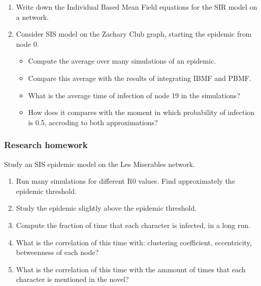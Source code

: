 \newpage

\begin{enumerate}
 \item Write down the Individual Based Mean Field equations for the SIR model on a network.
 \item Consider SIS model on the Zachary Club graph, starting the epidemic from node 0.
 \begin{itemize}
  \item Compute the average over many simulations of an epidemic.
 \item Compare this average with the results of integrating IBMF and PBMF.
\item What is the average time of infection of node 19 in the simulations?
\item How does it compares with the moment in which probability of infection is 0.5, accroding to both approximations?
 \end{itemize}
\end{enumerate}
 




\subsubsection{Research homework}
Study an SIS epidemic model on the Les Miserables network.
\begin{enumerate}
 \item Run many simulations for different R0 values. Find approximately the epidemic threshold.
 \item Study the epidemic slightly above the epidemic threshold.
 \item Compute the fraction of time that each character is infected, in a long run.
 \item What is the correlation of this time with: clustering coefficient, eccentricity, betweenness of each node?
 \item What is the correlation of this time with the ammount of times that each character is mentioned in the novel?
\end{enumerate}

